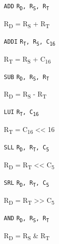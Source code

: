 
\newcommand{\rd}{R\textsubscript{D}}
\newcommand{\rt}{R\textsubscript{T}}
\newcommand{\rs}{R\textsubscript{S}}
\newcommand{\imm}[1]{C\textsubscript{#1}}

\newcommand{\mipss}{\textsuperscript{\textpm}}
\newcommand{\mipsu}{\textsuperscript{\textzerooldstyle}}

\newcommand{\floatright}{\newline\phantom{.}\hfill}
\newcommand{\insntab}{\tabto{3em}}

\newcommand{\opsl}{<{}<}
\newcommand{\opsr}{>{}>}
\newcommand{\opxor}{\ensuremath{\oplus}}

\newenvironment{mipsinsn}[3]{
	\begin{minipage}[c]{10em}
		\texttt{#1} \insntab \texttt{#2}
	\end{minipage}
	\hfill
	\begin{minipage}[c]{0.5\linewidth}
		\footnotesize #3
	\end{minipage}
}{
}

\begin{mipsinsn}{ADD}{\rd{}, \rs{}, \rt{}}{\rd{} = \rs{} + \rt{}}
\end{mipsinsn}

\begin{mipsinsn}{ADDI}{\rt{}, \rs{}, \imm{16}}{\rt{} = \rs{} + \imm{16}\mipss{}}
\end{mipsinsn}

\begin{mipsinsn}{SUB}{\rd{}, \rs{}, \rt{}}{\rd{} = \rs{} - \rt{}}
\end{mipsinsn}

\begin{mipsinsn}{LUI}{\rt{}, \imm{16}}{\rt{} = \imm{16} \opsl{} 16}
\end{mipsinsn}

\begin{mipsinsn}{SLL}{\rd{}, \rt{}, \imm{5}}{\rd{} = \rt{} \opsl{} \imm{5}\mipsu{}}
\end{mipsinsn}

\begin{mipsinsn}{SRL}{\rd{}, \rt{}, \imm{5}}{\rd{} = \rt{}\mipsu{} \opsr{} \imm{5}\mipsu{}}
\end{mipsinsn}

\begin{mipsinsn}{AND}{\rd{}, \rs{}, \rt{}}{\rd{} = \rs{} \& \rt{}}
\end{mipsinsn}

